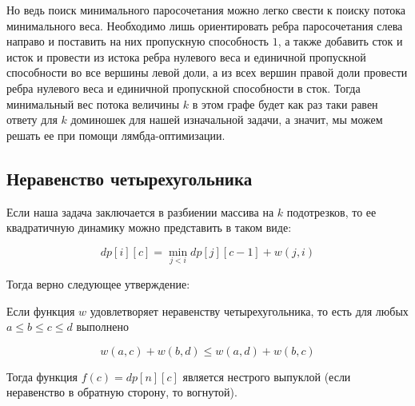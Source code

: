 Но ведь поиск минимального паросочетания можно легко свести к поиску потока минимального веса. Необходимо лишь ориентировать ребра паросочетания слева направо и поставить на них пропускную способность $1$, а также добавить сток и исток и провести из истока ребра нулевого веса и единичной пропускной способности во все вершины левой доли, а из всех вершин правой доли провести ребра нулевого веса и единичной пропускной способности в сток. Тогда минимальный вес потока величины $k$ в этом графе будет как раз таки равен ответу для $k$ доминошек для нашей изначальной задачи, а значит, мы можем решать ее при помощи лямбда-оптимизации.

\subsection{Неравенство четырехугольника}

Если наша задача заключается в разбиении массива на $k$ подотрезков, то ее квадратичную динамику можно представить в таком виде:

$$dp[i][c] = \min \limits_{j < i} dp[j][c - 1] + w(j, i)$$

Тогда верно следующее утверждение:

\begin{proposition}
    Если функция $w$ удовлетворяет неравенству четырехугольника, то есть для любых $a \le b \le c \le d$ выполнено

    $$w(a, c) + w(b, d) \le w(a, d) + w(b, c)$$

    Тогда функция $f(c) = dp[n][c]$ является нестрого выпуклой (если неравенство в обратную сторону, то вогнутой).
\end{proposition}


